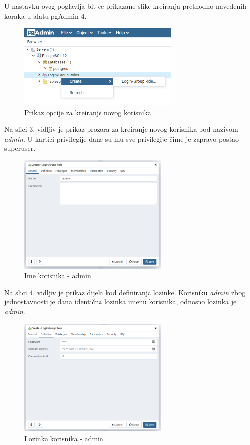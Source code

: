 \documentclass{foi}
\begin{document}
U  nastavku ovog poglavlja bit će prikazane slike kreiranja prethodno navedenih koraka u alatu pgAdmin 4.
\newline
\begin{figure}[h]
    \centering 
    \includegraphics[width=0.7\textwidth]{slike/kreiranje novog korisnika.PNG}
    \caption{Prikaz opcije za kreiranje novog korisnika}
    \label{slika-2}
\end{figure}

\newpage
Na slici 3. vidljiv je prikaz prozora za kreiranje novog korisnika pod nazivom \emph{admin}. U kartici privilegije dane su mu sve privilegije čime je zapravo postao superuser.

\begin{figure}[h]
    \centering 
    \includegraphics[width=0.65\textwidth]{slike/Ime korisnika - admin.PNG}
    \caption{Ime korisnika - admin}
    \label{slika-3}
\end{figure}
Na slici 4. vidljiv je prikaz dijela kod definiranja lozinke. Korisniku \emph{admin} zbog jednostavnosti je dana identična lozinka imenu korisnika, odnosno lozinka je \emph{admin}.
\begin{figure}[h]
    \centering 
    \includegraphics[width=0.65\textwidth]{slike/lozinka za admina(admin).PNG}
    \caption{Lozinka korisnika - admin}
    \label{slika-4}
\end{figure}
\end{document}
